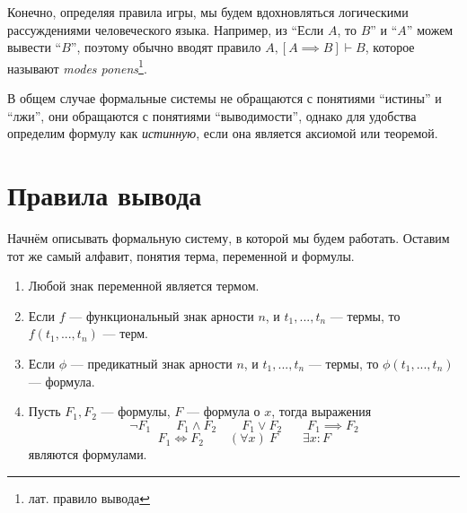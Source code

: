 Конечно, определяя правила игры, мы будем вдохновляться логическими рассуждениями
человеческого языка.
Например, из ``Если $A$, то $B$'' и ``$A$'' можем вывести ``$B$'', поэтому обычно
вводят правило ${A,[A\implies B]\vdash B}$,
которое называют {\it modes ponens}\footnote{лат. правило вывода}.

В общем случае формальные системы не обращаются с понятиями ``истины'' и ``лжи'',
они обращаются с понятиями ``выводимости'', однако для удобства определим формулу
как {\it истинную},
если она является аксиомой или теоремой.

\section{Правила вывода}

Начнём описывать формальную систему, в которой мы будем работать.
Оставим тот же самый алфавит, понятия терма, переменной и формулы.
\begin{fullwidth}
  \begin{multicols}{2}
    \begin{enumerate}
      \item{}Любой знак переменной является термом.
      \item{}Если $f$ --- функциональный знак арности $n$, и $t_1,...,t_{n}$ --- термы,
      то $f(t_1,...,t_{n})$ --- терм.
      \item{}Если $\phi$ --- предикатный знак арности $n$, и $t_1,...,t_{n}$ --- термы,
      то $\phi(t_1,...,t_{n})$ --- формула.

      \columnbreak

      \item{}Пусть $F_1,F_2$ --- формулы, $F$ --- формула о $x$, тогда выражения
      \[
        \lnot F_1\qquad F_1\land F_2\qquad F_1\lor F_2\qquad
        F_1\implies F_2
      \]
      \[
        F_1\iff F_2\qquad (\forall x)~F\qquad
        \exists x:F
      \]
      являются формулами.
    \end{enumerate}
  \end{multicols}
\end{fullwidth}

